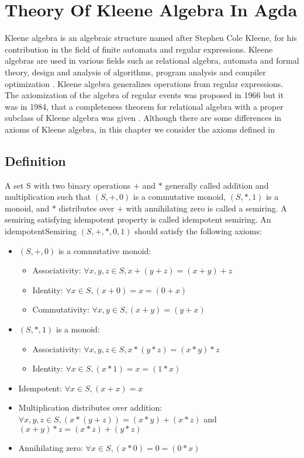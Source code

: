 \chapter{Theory Of Kleene Algebra In Agda}
Kleene algebra is an algebraic structure named after Stephen Cole Kleene, for
his contribution in the field of finite automata and regular expressions. Kleene
algebras are used in various fields such as relational algebra, automata and
formal theory, design and analysis of algorithms, program analysis and
compiler optimization \cite{kozen1997kleene}. Kleene algebra generalizes
operations from regular expressions. The axiomization of the algebra of regular
events was proposed in 1966 but it was in 1984, that a completeness theorem
for relational algebra with a proper subclass of Kleene algebra was given
\cite{kozen1994completeness}. Although there are some differences in axioms of
Kleene algebra, in this chapter we consider the axioms defined in
\cite{kozen1994completeness}

\section{Definition}
A set S with two binary operations $+$ and $*$ generally called addition and
multiplication such that $(S,+,0)$ is a commutative monoid, $(S,*,1)$ is a
monoid, and $*$ distributes over $+$ with annihilating zero is called a
semiring. A semiring satisfying idempotent property is called idempotent
semiring. An idempotentSemiring $(S,+,*,0,1)$ should satisfy the following
axioms:
\begin{itemize}
\item $(S,+,0)$ is a commutative monoid:
\begin{itemize}
  \item Associativity: $\forall x,y,z \in S, x + (y + z) = (x + y) + z$
  \item Identity: $\forall x \in S, (x + 0) = x = (0 + x)$
  \item Commutativity: $\forall x,y \in S, (x + y) = (y + x)$
\end{itemize}
\item $(S,*,1)$ is a monoid:
\begin{itemize}
  \item Associativity: $ \forall x,y,z \in S, x * (y*z)  = (x*y)*z$
  \item Identity: $\forall x \in S, (x * 1) = x = (1 * x)$
\end{itemize}
\item Idempotent: $\forall x \in S, (x + x) = x$
\item Multiplication distributes over addition: \(\forall x , y , z \in S, (x * (y + z)) = (x * y) + (x
* z)\) and \( (x + y) * z = (x * z) + (y * z) \)
\item Annihilating zero: \(\forall x \in S, (x * 0) = 0 = (0 * x)\)
\end{itemize}


